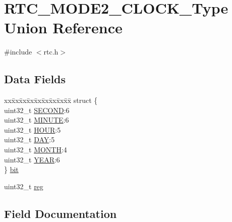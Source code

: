 \hypertarget{union_r_t_c___m_o_d_e2___c_l_o_c_k___type}{}\section{R\+T\+C\+\_\+\+M\+O\+D\+E2\+\_\+\+C\+L\+O\+C\+K\+\_\+\+Type Union Reference}
\label{union_r_t_c___m_o_d_e2___c_l_o_c_k___type}


{\ttfamily \#include $<$rtc.\+h$>$}

\subsection*{Data Fields}
\begin{DoxyCompactItemize}
\item 
\begin{tabbing}
xx\=xx\=xx\=xx\=xx\=xx\=xx\=xx\=xx\=\kill
struct \{\\
\>uint32\_t \mbox{\hyperlink{union_r_t_c___m_o_d_e2___c_l_o_c_k___type_a3c1af5a31c00cc624e89e3f26e47c069}{SECOND}}:6\\
\>uint32\_t \mbox{\hyperlink{union_r_t_c___m_o_d_e2___c_l_o_c_k___type_aab46c8de29168b7526efa8d64279084c}{MINUTE}}:6\\
\>uint32\_t \mbox{\hyperlink{union_r_t_c___m_o_d_e2___c_l_o_c_k___type_abd1a2f4aa3c1449d36773b8cc12be97f}{HOUR}}:5\\
\>uint32\_t \mbox{\hyperlink{union_r_t_c___m_o_d_e2___c_l_o_c_k___type_a9da2ace6ec7bed3e1e0ebc858221256f}{DAY}}:5\\
\>uint32\_t \mbox{\hyperlink{union_r_t_c___m_o_d_e2___c_l_o_c_k___type_ab5bf77b6909ffcc2b96155025e406700}{MONTH}}:4\\
\>uint32\_t \mbox{\hyperlink{union_r_t_c___m_o_d_e2___c_l_o_c_k___type_ada0131b43bb6b8e77fb3afbe4e25e4d4}{YEAR}}:6\\
\} \mbox{\hyperlink{union_r_t_c___m_o_d_e2___c_l_o_c_k___type_a6b4ae81dd6a40db537dc7fb2cc19d3d5}{bit}}\\

\end{tabbing}\item 
uint32\+\_\+t \mbox{\hyperlink{union_r_t_c___m_o_d_e2___c_l_o_c_k___type_a6b91636401516a477989a336376d7b40}{reg}}
\end{DoxyCompactItemize}


\subsection{Field Documentation}
\mbox{\label{union_r_t_c___m_o_d_e2___c_l_o_c_k___type_a6b4ae81dd6a40db537dc7fb2cc19d3d5}} 
